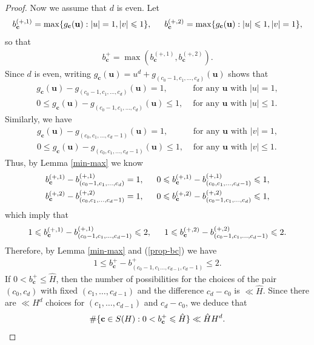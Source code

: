 \documentclass[reqno, 11pt]{amsart}
\renewcommand{\leq}{\leqslant}
\theoremstyle{definition}
\theoremstyle{definition}
\renewcommand{\leq}{\leqslant}
\newcommand{\cc}{\mathbf{c}}
\newcommand{\uu}{\mathbf{u}}
\numberwithin{equation}{section}
\begin{document}
\begin{proof}
Now we assume that $d$ is even.
	Let 
	$$b^{(+,1)}_{\cc} = \max\{g_\cc(\uu): |u| = 1, |v| \leq 1\}, \indent b^{(+,2)}_{\cc} = \max\{g_\cc(\uu): |u| \leq 1, |v| = 1\},$$
	so that
	\begin{align}\label{prop-bc}
		b^+_{\cc} = \max(b^{(+,1)}_{\cc}, b^{(+,2)}_{\cc}).
	\end{align}	
	Since $d$ is even, writing
	$g_\cc(\uu) = u^d + g_{(c_0-1, c_1, \dots, c_d)}(\uu)$ shows that
	\begin{align*}
		g_\cc(\uu) - g_{(c_0-1, c_1, \dots, c_d)}(\uu) = 1, & \text{ for any } \uu \text{ with } |u| = 1, \\
	 0 \leq g_\cc(\uu) - g_{(c_0-1, c_1, \dots, c_d)}(\uu) \leq 1, & \text{ for any } \uu \text{ with } |u| \leq 1.
	\end{align*}
	Similarly, we have
	\begin{align*}
		g_\cc(\uu) - g_{(c_0, c_1, \dots, c_d-1)}(\uu) = 1, & \text{ for any } \uu \text{ with } |v| = 1, \\
	 0 \leq g_\cc(\uu) - g_{(c_0, c_1, \dots, c_d-1)}(\uu) \leq 1, & \text{ for any } \uu \text{ with } |v| \leq 1.
	\end{align*}
	Thus, by Lemma \ref{min-max} we know
	\begin{align*}
		b^{(+,1)}_{\cc} - b^{(+,1)}_{(c_0-1, c_1, \dots, c_d)} = 1, \indent 0 \leq b^{(+,1)}_{\cc} - b^{(+,1)}_{(c_0, c_1, \dots, c_d-1)} \leq 1,\\
		b^{(+,2)}_{\cc} - b^{(+,2)}_{(c_0, c_1, \dots, c_d-1)} = 1, \indent 0 \leq b^{(+,2)}_{\cc} - b^{(+,2)}_{(c_0-1, c_1, \dots, c_d)} \leq 1,
	\end{align*}
	which imply that
	\begin{align*}
		1 \leq b^{(+,1)}_{\cc} - b^{(+,1)}_{(c_0-1, c_1, \dots, c_d-1)} \leq 2, \indent 1 \leq  b^{(+,2)}_{\cc} - b^{(+,2)}_{(c_0-1, c_1, \dots, c_d-1)} \leq 2.
	\end{align*}
	Therefore, by Lemma \ref{min-max} and (\ref{prop-bc}) we have
	\begin{align*}
		1 \leq b^+_\cc - b^+_{(c_0-1, c_1 \dots, c_{d-1}, c_d-1)} \leq 2.
	\end{align*}
	If $0 < b^+_\cc \leq \hat{H}$, then the number of possibilities for the choices of the pair $(c_0, c_d)$ with fixed $(c_1, \dots, c_{d-1})$ and the difference $c_d - c_0$ is $\ll \hat{H}$.
	Since there are $\ll H^{d}$ choices for $(c_1, \dots, c_{d-1})$ and $c_d - c_0$, we deduce that 
\begin{equation*}
		\#\{\cc \in S(H): 0 < b_\cc^{+} \leq \hat{H} \} \ll \hat{H}H^d.\qedhere
\end{equation*}
\end{proof}
\end{document}
